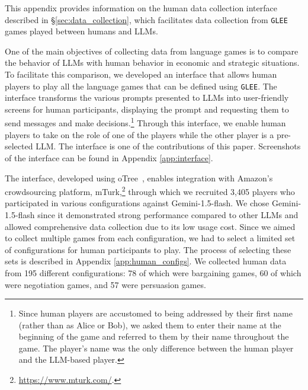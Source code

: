 This appendix provides information on the human data collection interface described in \S\ref{sec:data_collection}, which facilitates data collection from \texttt{GLEE} games played between humans and LLMs.

One of the main objectives of collecting data from language games is to compare the behavior of LLMs with human behavior in economic and strategic situations. To facilitate this comparison, we developed an interface that allows human players to play all the language games that can be defined using \texttt{GLEE}. The interface transforms the various prompts presented to LLMs into user-friendly screens for human participants, displaying the prompt and requesting them to send messages and make decisions.\footnote{Since human players are accustomed to being addressed by their first name (rather than as Alice or Bob), we asked them to enter their name at the beginning of the game and referred to them by their name throughout the game. The player's name was the only difference between the human player and the LLM-based player.} Through this interface, we enable human players to take on the role of one of the players while the other player is a pre-selected LLM. The interface is one of the contributions of this paper. Screenshots of the interface can be found in Appendix \ref{app:interface}.

The interface, developed using oTree~\parencite{CHEN201688}, enables integration with Amazon's crowdsourcing platform, mTurk,\footnote{\url{https://www.mturk.com/}.} through which we recruited 3,405 players who participated in various configurations against Gemini-1.5-flash. We chose Gemini-1.5-flash since it demonstrated strong performance compared to other LLMs and allowed comprehensive data collection due to its low usage cost. Since we aimed to collect multiple games from each configuration, we had to select a limited set of configurations for human participants to play. The process of selecting these sets is described in Appendix \ref{app:human_configs}. We collected human data from 195 different configurations: 78 of which were bargaining games, 60 of which were negotiation games, and 57 were persuasion games.

